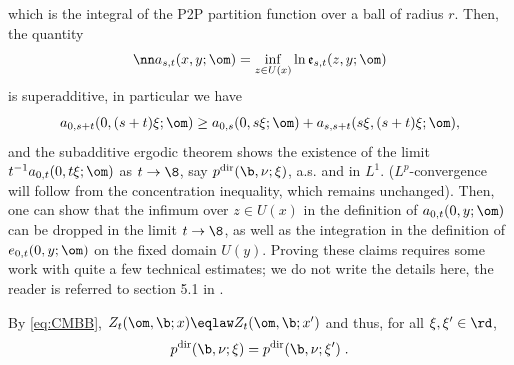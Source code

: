 which is the integral of the P2P partition function over a ball of radius $r$. Then, the quantity 
\begin{equation} \nn
a_{s,t}(x,y;\om)= \inf_{z \in U(x)} \ln {\mathfrak e}_{s,t}(z, y; \om)
\end{equation}
is superadditive, in particular we have
$$a_{0,s+t}(0, (s+t)\xi; \om) \geq  a_{0,s}(0, s\xi; \om) + a_{s,s+t}(s\xi, (s+t)\xi; \om), $$
and the subadditive ergodic theorem shows the existence of the limit $t^{-1} a_{0,t}(0, t\xi; \om)$ as $t \to \8$, say $ p^{\rm dir}(\b, \nu; \xi )$, a.s. and in $L^1$. 
($L^p$-convergence will follow from the concentration inequality, which remains unchanged).
Then, one can show that the infimum over $z \in U(x) $ in the definition of $a_{0,t}(0,y;\om)$ can be dropped in the limit $t \to \8$, as well as the integration 
 in the definition of  $e_{0,t}(0,y;\om)$ on the fixed domain $ U(y)$. Proving these claims requires some work with quite a few technical estimates;
 we do not write the details here, the reader is referred to section 5.1 in \cite{Sznitman}.




By \eqref{eq:CMBB}, $Z_t(\om, \b; x)\eqlaw Z_t(\om, \b; x')$ and thus, for all $\xi, \xi' \in \rd$,
\begin{equation}\label{eq:samepdir}
p^{\rm dir}(\b, \nu; \xi ) = p^{\rm dir}(\b, \nu; \xi' ) \;.
\end{equation}
